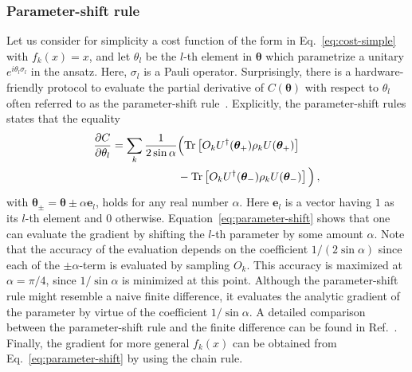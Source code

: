 \documentclass[prx,twocolumn,floatfix,superscriptaddress,longbibliography]{revtex4-1}
\renewcommand{\vec}[1]{\boldsymbol{#1}}  %
\newcommand{\<}{\langle}
\renewcommand{\>}{\rangle}
\newcommand{\Tr}{{\rm Tr}}
\renewcommand{\vec}[1]{\boldsymbol{#1}}  %
\newcommand{\ad}{^\dagger}
\begin{document}
\subsubsection{ Parameter-shift rule} Let us consider for simplicity a cost function of the form in Eq.~\eqref{eq:cost-simple} with $f_k(x)=x$, and let  $\theta_l$ be the $l$-th element in $ \vec{\theta}$ which parametrize a unitary $e^{i\theta_l\sigma_{l}}$ in the ansatz. Here, $\sigma_l$ is a Pauli operator. Surprisingly, there is a hardware-friendly protocol to evaluate the partial derivative of $C(\vec{\theta})$ with respect to $\theta_l$ often referred to as the parameter-shift rule~\cite{guerreschi2017practical, mitarai2018quantum,schuld2019evaluating,bergholm2018pennylane}. Explicitly, the parameter-shift rules states that the equality 
\begin{align}\label{eq:parameter-shift}
    \frac{\partial C}{\partial \theta_l} = \sum_{k}\frac{1}{2\sin \alpha}&\Big( \Tr\left[O_{k} U\ad(\vec{\theta}_+) \rho_k U(\vec{\theta}_+)\right]\nonumber\\& -\Tr\left[O_{k} U\ad(\vec{\theta}_-) \rho_k U(\vec{\theta}_-)\right]\Big)\,,
\end{align}
with $\vec{\theta}_{\pm}=\vec{\theta}\pm\alpha\vec{e}_l$, holds for any real number $\alpha$. Here  $\vec{e}_l$ is a vector having $1$ as its $l$-th element and $0$ otherwise. Equation~\eqref{eq:parameter-shift} shows that one can evaluate the gradient by shifting the $l$-th parameter by some amount $\alpha$. Note that the accuracy of the evaluation depends on the coefficient $1/(2\sin\alpha)$ since each of the $\pm \alpha$-term is evaluated by sampling $O_k$. This accuracy is maximized at $\alpha=\pi/4$, since $1/\sin\alpha$ is minimized at this point. Although the parameter-shift rule might resemble a naive finite difference, it evaluates the analytic gradient of the parameter by virtue of the coefficient $1/\sin\alpha$. A detailed comparison between the parameter-shift rule and the finite difference can be found in Ref.~\cite{mari2020estimating}. Finally, the gradient for more general $f_k(x)$ can be obtained from Eq.~\eqref{eq:parameter-shift} by using the chain rule. 
\end{document}
